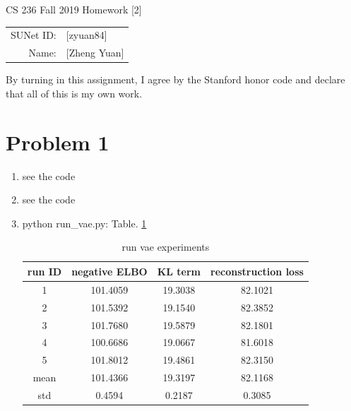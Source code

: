 \documentclass[12pt]{article}
\begin{document}
\begin{center}
{\Large CS 236 Fall 2019 Homework [2]}

\begin{tabular}{rl}
SUNet ID: & [zyuan84] \\
Name: & [Zheng Yuan] \\
\end{tabular}
\end{center}

By turning in this assignment, I agree by the Stanford honor code and declare
that all of this is my own work.

\section*{Problem 1}
\begin{enumerate}
	\item 
	see the code
	
	\item 
	see the code
	
	\item 
	python run\_vae.py: Table. \ref{table:vae}
	
	\begin{table}[ht]
		\caption{run vae experiments} %
		\centering %
		\begin{tabular}{c c c c} %
			\hline\hline %
			run ID & negative ELBO & KL term & reconstruction loss \\ [0.5ex] %
			\hline %
			1 & 101.4059 & 19.3038 & 82.1021 \\ %
			2 & 101.5392 & 19.1540 & 82.3852 \\
			3 & 101.7680 & 19.5879 & 82.1801 \\
			4 & 100.6686 & 19.0667 & 81.6018 \\
			5 & 101.8012 & 19.4861 & 82.3150 \\ 
			mean & 101.4366 & 19.3197 & 82.1168 \\
			std & 0.4594 & 0.2187 & 0.3085 \\[1ex] %
			\hline %
		\end{tabular}
		\label{table:vae} %
	\end{table}


\end{enumerate}
\end{document}
